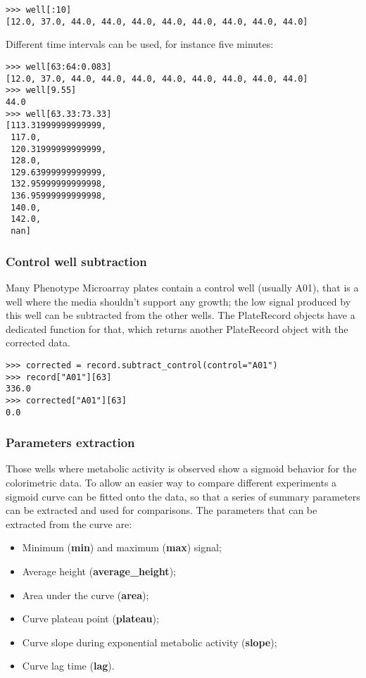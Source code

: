 \begin{verbatim}
>>> well[:10]  
[12.0, 37.0, 44.0, 44.0, 44.0, 44.0, 44.0, 44.0, 44.0, 44.0]
\end{verbatim}

Different time intervals can be used, for instance five minutes:
\begin{verbatim}
>>> well[63:64:0.083]
[12.0, 37.0, 44.0, 44.0, 44.0, 44.0, 44.0, 44.0, 44.0, 44.0]
>>> well[9.55]
44.0
>>> well[63.33:73.33]
[113.31999999999999,
 117.0,
 120.31999999999999,
 128.0,
 129.63999999999999,
 132.95999999999998,
 136.95999999999998,
 140.0,
 142.0,
 nan]
\end{verbatim}

\subsubsection{Control well subtraction}
Many Phenotype Microarray plates contain a control well (usually A01), that is a well where the media shouldn't support
any growth; the low signal produced by this well can be subtracted from the other wells.
The PlateRecord objects have a dedicated function for that, which returns another PlateRecord object
with the corrected data.

\begin{verbatim}
>>> corrected = record.subtract_control(control="A01")
>>> record["A01"][63]
336.0
>>> corrected["A01"][63]
0.0
\end{verbatim}

\subsubsection{Parameters extraction}
Those wells where metabolic activity is observed show a sigmoid behavior for the colorimetric data.
To allow an easier way to compare different experiments a sigmoid curve can be fitted onto the data,
so that a series of summary parameters can be extracted and used for comparisons.
The parameters that can be extracted from the curve are:

\begin{itemize}
  \item Minimum (\textbf{min}) and maximum (\textbf{max}) signal;

  \item Average height (\textbf{average\_height});

  \item Area under the curve (\textbf{area});

  \item Curve plateau point (\textbf{plateau});

  \item Curve slope during exponential metabolic activity (\textbf{slope});

  \item Curve lag time (\textbf{lag}).
\end{itemize}

